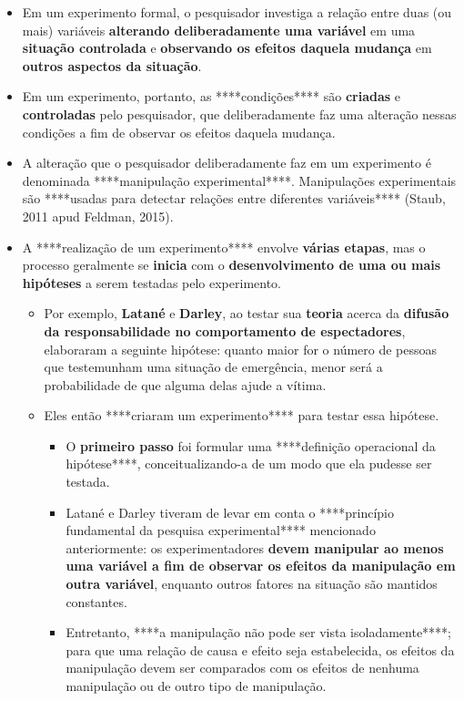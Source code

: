 \documentclass[
]{book}
\providecommand{\tightlist}{%
  \setlength{\itemsep}{0pt}\setlength{\parskip}{0pt}}
\begin{document}
\begin{itemize}
\tightlist
\item
  Em um experimento formal, o pesquisador investiga a relação entre duas (ou mais) variáveis \textbf{alterando deliberadamente uma variável} em uma \textbf{situação controlada} e \textbf{observando os efeitos daquela mudança} em \textbf{outros aspectos da situação}.
\item
  Em um experimento, portanto, as ****condições**** são \textbf{criadas} e \textbf{controladas} pelo pesquisador, que deliberadamente faz uma alteração nessas condições a fim de observar os efeitos daquela mudança.
\item
  A alteração que o pesquisador deliberadamente faz em um experimento é denominada ****manipulação experimental****. Manipulações experimentais são ****usadas para detectar relações entre diferentes variáveis**** (Staub, 2011 apud Feldman, 2015).
\item
  A ****realização de um experimento**** envolve \textbf{várias etapas}, mas o processo geralmente se \textbf{inicia} com o \textbf{desenvolvimento de uma ou mais hipóteses} a serem testadas pelo experimento.

  \begin{itemize}
  \tightlist
  \item
    Por exemplo, \textbf{Latané} e \textbf{Darley}, ao testar sua \textbf{teoria} acerca da \textbf{difusão da responsabilidade no comportamento de espectadores}, elaboraram a seguinte hipótese: quanto maior for o número de pessoas que testemunham uma situação de emergência, menor será a probabilidade de que alguma delas ajude a vítima.
  \item
    Eles então ****criaram um experimento**** para testar essa hipótese.

    \begin{itemize}
    \tightlist
    \item
      O \textbf{primeiro passo} foi formular uma ****definição operacional da hipótese****, conceitualizando-a de um modo que ela pudesse ser testada.
    \item
      Latané e Darley tiveram de levar em conta o ****princípio fundamental da pesquisa experimental**** mencionado anteriormente: os experimentadores \textbf{devem manipular ao menos uma variável a fim de observar os efeitos da manipulação em outra variável}, enquanto outros fatores na situação são mantidos constantes.
    \item
      Entretanto, ****a manipulação não pode ser vista isoladamente****; para que uma relação de causa e efeito seja estabelecida, os efeitos da manipulação devem ser comparados com os efeitos de nenhuma manipulação ou de outro tipo de manipulação.
    \end{itemize}
  \end{itemize}
\end{itemize}
\end{document}
